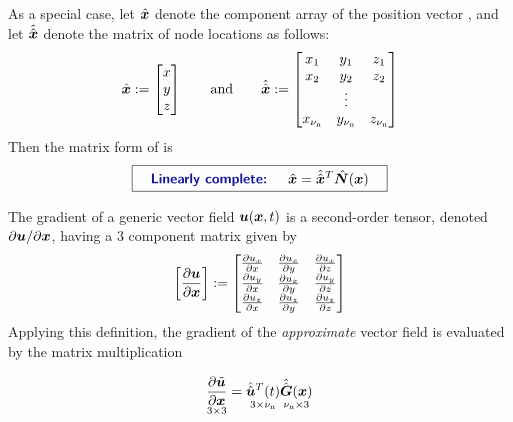 As a special case, let $\hat{\bm{x}}$ denote the component array of the position vector \x, and let $\hat{\hat{\bm{x}}}$ denote the matrix of node locations as follows:
\begin{equation}
  \hat{\bm{x}}:=\begin{bmatrix}
                               x \\ 
                               y \\ 
                               z
                        \end{bmatrix}
\qquad\text{and}\qquad
  \hat{\hat{\bm{x}}}:=
\begin{bmatrix}
x_{1} & y_{1} &  z_{1} \\
x_{2} & y_{2} &  z_{2} \\
              &     \vdots    &                \\
x_{{\nu_\text{n}}} & y_{{\nu_\text{n}}} &  z_{{\nu_\text{n}}}
\end{bmatrix}
\end{equation}
Then the matrix form of  is
\begin{equation}
  \boxit{\quad
\text{\Defn{Linearly complete: }}\quad
\Array{x}=\AArray{x}^T\NBFa(\x)
\quad}
\label{eq:highDimLinearlyComplete}
\end{equation}

The gradient of a generic vector field $\bm{u}(\bm{x},{t})$ is a second-order tensor, denoted $\partial\bm{u}/\partial\bm{x}$, having a 3 component matrix given by
\begin{equation}
\left[\frac{\partial {\ensuremath{\bm{u}}}}{\partial {\ensuremath{\bm{x}}}}\right]:=
\begin{bmatrix}
\frac{\partial {u_x}}{\partial {x}} & \frac{\partial {u_x}}{\partial {y}} & \frac{\partial {u_x}}{\partial {z}} \\
\frac{\partial {u_y}}{\partial {x}} & \frac{\partial {u_x}}{\partial {y}} & \frac{\partial {u_y}}{\partial {z}} \\
\frac{\partial {u_z}}{\partial {x}} & \frac{\partial {u_z}}{\partial {y}} & \frac{\partial {u_z}}{\partial {z}}
\end{bmatrix}
\end{equation}
Applying this definition, the gradient of the \emph{approximate} vector field is evaluated by the matrix multiplication



\begin{equation}
  \underset{3\times3}{\frac{\partial {\tilde{\ensuremath{\bm{u}}}}}{\partial {\ensuremath{\bm{x}}}}}= 
\underset{3\times{\nu_\text{n}}}{\hat{\hat{\bm{u}}}^T({t})}
\underset{{\nu_\text{n}}\times3}{\hat{\hat{\bm{G}}}(\bm{x})}
\label{eq:gradfieldOnGridcMatrixC}
\end{equation}








